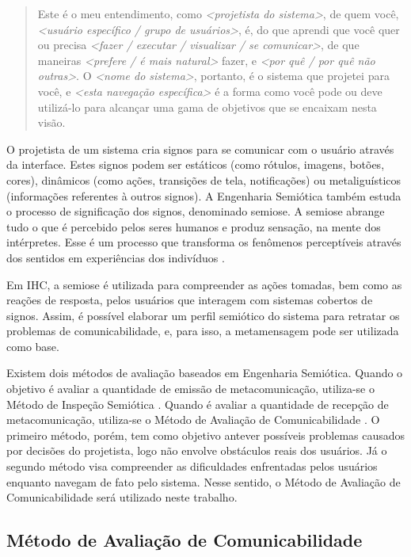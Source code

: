 \begin{quote}
Este é o meu entendimento, como \textit{<projetista do sistema>}, de quem você, \textit{<usuário específico / grupo de usuários>}, é, do que aprendi que você quer ou precisa \textit{<fazer / executar / visualizar / se comunicar>}, de que maneiras \textit{<prefere / é mais natural>} fazer, e \textit{<por quê / por quê não outras>}. O \textit{<nome do sistema>}, portanto, é o sistema que projetei para você, e \textit{<esta navegação específica>} é a forma como você pode ou deve utilizá-lo para alcançar uma gama de objetivos que se encaixam nesta visão.
\end{quote}

\indent O projetista de um sistema cria signos para se comunicar com o usuário através da interface. Estes signos podem ser estáticos (como rótulos, imagens, botões, cores), dinâmicos (como ações, transições de tela, notificações) ou metaliguísticos (informações referentes à outros signos). A Engenharia Semiótica também estuda o processo de significação dos signos, denominado semiose. A semiose abrange tudo o que é percebido pelos seres humanos e produz sensação, na mente dos intérpretes. Esse é um processo que transforma os fenômenos perceptíveis através dos sentidos em experiências dos indivíduos \cite{semiose01}. 

\indent Em IHC, a semiose é utilizada para compreender as ações tomadas, bem como as reações de resposta, pelos usuários que interagem com sistemas cobertos de signos. Assim, é possível elaborar um perfil semiótico do sistema para retratar os problemas de comunicabilidade, e, para isso, a metamensagem pode ser utilizada como base.

\indent Existem dois métodos de avaliação baseados em Engenharia Semiótica. Quando o objetivo é avaliar a quantidade de emissão de metacomunicação, utiliza-se o Método de Inspeção Semiótica \cite{IHCbook}. Quando é avaliar a quantidade de recepção de metacomunicação, utiliza-se o Método de Avaliação de Comunicabilidade \cite{IHCbook}. O primeiro método, porém, tem como objetivo antever possíveis problemas causados por decisões do projetista, logo não envolve obstáculos reais dos usuários. Já o segundo método visa compreender as dificuldades enfrentadas pelos usuários enquanto navegam de fato pelo sistema. Nesse sentido, o Método de Avaliação de Comunicabilidade será utilizado neste trabalho.


\subsection{Método de Avaliação de Comunicabilidade} \label{MAC}

